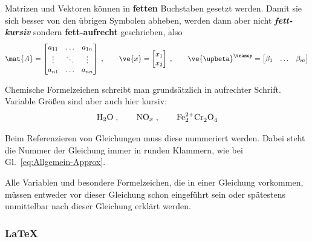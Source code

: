 Matrizen und Vektoren können in \textbf{fetten} Buchstaben gesetzt werden.
Damit sie sich besser von den übrigen Symbolen abheben, werden dann aber nicht \textbf{\emph{fett-kursiv}} sondern \textbf{fett-aufrecht} geschrieben, also \zB
\begin{equation*}
  \mat{A} = \begin{bmatrix}
    a_{11} & \ldots & a_{1n}\\
    \vdots & \ddots & \vdots\\
    a_{n1} & \ldots & a_{nn}
  \end{bmatrix}\;,\qquad
  \ve{x} = \begin{bmatrix}
    x_1\\
    x_2
  \end{bmatrix}\;,\qquad
  \ve{\upbeta}^\transp = \begin{bmatrix}\beta_1  &  \ldots  &  \beta_m\end{bmatrix}
\end{equation*}

Chemische Formelzeichen schreibt man grundsätzlich in aufrechter Schrift.
Variable Größen sind aber auch hier kursiv:
\begin{equation*}
  \mathrm{H_2 O}\;,\qquad
  \mathrm{NO}_x\;,\qquad
  \mathrm{Fe_2^{2+}Cr_2^{\vphantom{2+}}O_4^{\vphantom{2+}}}
\end{equation*}


Beim Referenzieren von Gleichungen muss diese nummeriert werden. Dabei steht die Nummer der Gleichung immer in runden Klammern, wie bei Gl.~\eqref{eq:Allgemein-Approx}.

Alle Variablen und besondere Formelzeichen, die in einer Gleichung vorkommen, müssen entweder vor dieser Gleichung schon eingeführt sein oder spätestens unmittelbar nach dieser Gleichung erklärt werden.


\subsubsection*{\LaTeX}

